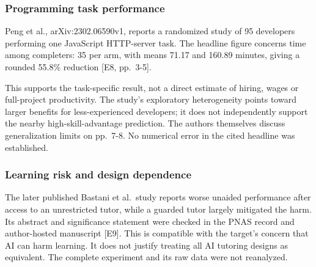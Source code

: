 \documentclass[10pt]{article}
\begin{document}
\subsubsection*{Programming task performance}
Peng et al., arXiv:2302.06590v1, reports a randomized study of 95 developers performing one JavaScript HTTP-server task. The headline figure concerns time among completers: 35 per arm, with means 71.17 and 160.89 minutes, giving a rounded 55.8\% reduction [E8, pp. 3-5].\par
This supports the task-specific result, not a direct estimate of hiring, wages or full-project productivity. The study’s exploratory heterogeneity points toward larger benefits for less-experienced developers; it does not independently support the nearby high-skill-advantage prediction. The authors themselves discuss generalization limits on pp. 7-8. No numerical error in the cited headline was established.\par
\subsubsection*{Learning risk and design dependence}
The later published Bastani et al. study reports worse unaided performance after access to an unrestricted tutor, while a guarded tutor largely mitigated the harm. Its abstract and significance statement were checked in the PNAS record and author-hosted manuscript [E9]. This is compatible with the target’s concern that AI can harm learning. It does not justify treating all AI tutoring designs as equivalent. The complete experiment and its raw data were not reanalyzed.\par
\end{document}
